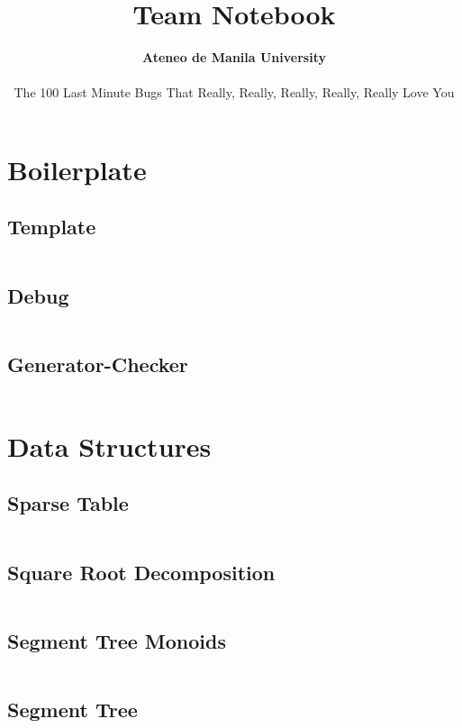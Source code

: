 \documentclass[a4paper, 8pt, landscape, oneside]{extarticle}
\newcommand{\schoolname}{Ateneo de Manila University}
\newcommand{\teamname}{The 100 Last Minute Bugs That Really, Really, Really, Really, Really Love You}
\begin{document}
\title{\textbf{Team Notebook}}
\author{\textbf{\schoolname} \\\\ \teamname}

\begin{multicols*}{2}
    \maketitle
    \tableofcontents
    \clearpage
\end{multicols*}

\begin{multicols*}{3}
	\section{Boilerplate}
		\subsection{Template}
		\inputminted{cpp}{src/boilerplate/01-template.hpp}
		\subsection{Debug}
		\inputminted{cpp}{src/boilerplate/02-debug.hpp}
		\subsection{Generator-Checker}
		\inputminted{cpp}{src/boilerplate/gene-checker.py}
	\section{Data Structures}
		\subsection{Sparse Table}
		\inputminted{cpp}{src/ds/sparsetable.cpp}
		\subsection{Square Root Decomposition}
		\inputminted{cpp}{src/ds/sqrtdecomp.cpp}
		\subsection{Segment Tree Monoids}
		\inputminted{cpp}{src/ds/monoids.cpp}
		\subsection{Segment Tree}
		\inputminted{cpp}{src/ds/segtree.cpp}

\end{multicols*}
\end{document}
